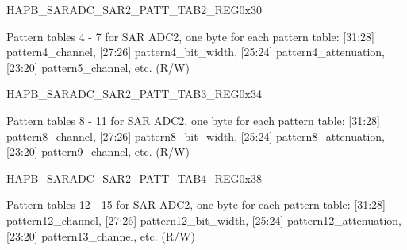 \begin{register}{H}{APB\_SARADC\_SAR2\_PATT\_TAB2\_REG}{0x30}\label{regdesc:APBSARADCSAR2PATTTAB2REG}
%
\regnewline%
\begin{regdesc}\begin{reglist}
\item [APB\_SARADC\_SAR2\_PATT\_TAB2\_REG]Pattern tables 4 - 7 for  SAR ADC2, one byte for each pattern table: [31:28] pattern4\_channel, [27:26] pattern4\_bit\_width, [25:24] pattern4\_attenuation, [23:20] pattern5\_channel,  etc. (R/W)
\end{reglist}\end{regdesc}
\end{register}


\begin{register}{H}{APB\_SARADC\_SAR2\_PATT\_TAB3\_REG}{0x34}\label{regdesc:APBSARADCSAR2PATTTAB3REG}
%
\regnewline%
\begin{regdesc}\begin{reglist}
\item [APB\_SARADC\_SAR2\_PATT\_TAB3\_REG]Pattern tables 8 - 11 for SAR ADC2, one byte for each pattern table: [31:28] pattern8\_channel, [27:26] pattern8\_bit\_width, [25:24] pattern8\_attenuation, [23:20] pattern9\_channel,  etc. (R/W)
\end{reglist}\end{regdesc}
\end{register}


\begin{register}{H}{APB\_SARADC\_SAR2\_PATT\_TAB4\_REG}{0x38}\label{regdesc:APBSARADCSAR2PATTTAB4REG}
%
\regnewline%
\begin{regdesc}\begin{reglist}
\item [APB\_SARADC\_SAR2\_PATT\_TAB4\_REG]Pattern tables 12 - 15 for SAR ADC2, one byte for each pattern table: [31:28] pattern12\_channel, [27:26] pattern12\_bit\_width, [25:24] pattern12\_attenuation, [23:20] pattern13\_channel,  etc. (R/W)
\end{reglist}\end{regdesc}
\end{register}
